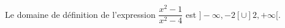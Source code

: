 Le domaine de définition de l'expression $\dfrac{x^2-1}{x^2-4}$ est $]-\infty,-2[\cup]2,+\infty[$.

\begin{reponses}
\end{reponses}

